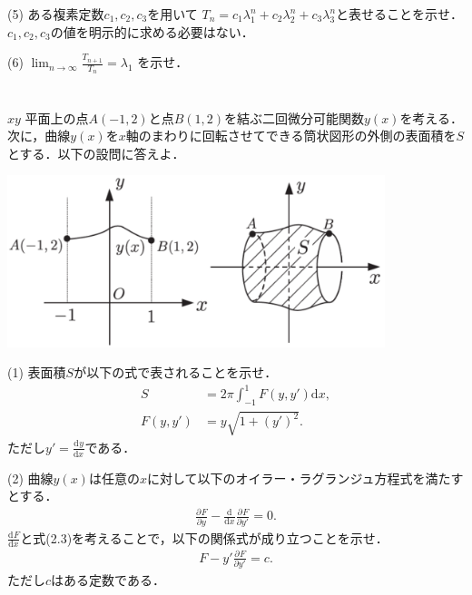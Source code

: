 \documentclass[a4j]{jarticle}
\let \ds \displaystyle
\newcommand{\diff}[3]{
  \frac{\mathrm{d}^{#1} #2}{\mathrm{d} #3^{#1}}
}
\newcommand{\pdiff}[3]{
  \frac{\partial^{#1} #2}{\partial #3^{#1}}
}
\begin{document}
\begin{screen}
 (5) ある複素定数$c_1,c_2,c_3$を用いて $T_n = c_1\lambda_1^n+c_2\lambda_2^n+c_3\lambda_3^n$と表せることを示せ．$c_1,c_2,c_3$の値を明示的に求める必要はない．
\end{screen}

\begin{screen}
 (6) $\ds \lim_{n \rightarrow \infty} \frac{T_{n+1}}{T_n} = \lambda_1$ を示せ．
\end{screen}
\section{}

\begin{screen}
 $xy$ 平面上の点$A(-1,2)$と点$B(1,2)$を結ぶ二回微分可能関数$y(x)$を考える．次に，曲線$y(x)$を$x$軸のまわりに回転させてできる筒状図形の外側の表面積を$S$とする．以下の設問に答えよ．
 
 \centering\includegraphics[width=11cm]{figure_2016_01.png}
\end{screen}

\begin{screen}
 (1) 表面積$S$が以下の式で表されることを示せ．
 \begin{align*}
  S &= 2 \pi \int_{-1}^1 F(y,y') \mathrm{d}x,\tag{2.1} \\
  F(y,y') &=y \sqrt{ 1 + \left(y'\right)^2}. \tag{2.2}
 \end{align*}
 ただし$\ds y' = \diff{}{y}{x}$である．
\end{screen}

\begin{screen}
 (2) 曲線$y(x)$は任意の$x$に対して以下のオイラー・ラグランジュ方程式を満たすとする．
 \begin{align*}
  \pdiff{}{F}{y} - \diff{}{}{x}\pdiff{}{F}{y'} = 0. \tag{2.3}
 \end{align*}
 $\ds \diff{}{F}{x}$と式(2.3)を考えることで，以下の関係式が成り立つことを示せ．
 \begin{align*}
  F - y'\pdiff{}{F}{y'} = c. \tag{2.4}
 \end{align*}
 ただし$c$はある定数である．
\end{screen}
\end{document}
